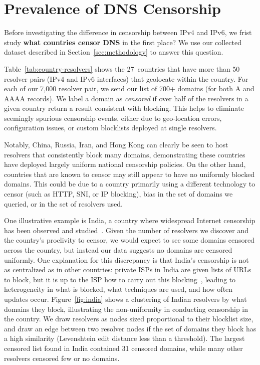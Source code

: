 \section{Prevalence of DNS Censorship}\label{sec:prevalence}


Before investigating the difference in censorship between IPv4 and IPv6, we
frist study \textbf{what countries censor DNS} in the first place?
We use our collected dataset described in Section~\ref{sec:methodology} to
answer this question.




\SomeCountryTable


Table~\ref{tab:country-resolvers} shows the 27~countries that have more than 50
resolver pairs (IPv4 and IPv6 interfaces) that geolocate within the country.
For each of our 7,000 resolver pair, we send our list of 700+ domains (for both A
and AAAA records). We label a domain as \emph{censored} if over half of the
resolvers in a given country return a result consistent with blocking. This
helps to eliminate seemingly spurious censorship events, either due to geo-location
errors, configuration issues, or custom blocklists deployed at single resolvers.

Notably, China, Russia, Iran, and Hong Kong can clearly be seen to host
resolvers that consistently block many domains, demonstrating these countries have
deployed largely uniform national censorship policies. On the other hand,
countries that are known to censor may still appear to have no uniformly blocked
domains. This could be due to a country primarily using a different technology
to censor (such as HTTP, SNI, or IP blocking), bias in the set of domains we
queried, or in the set of resolvers used.

One illustrative example is India, a country where widespread Internet censorship has
been observed and studied~\cite{singh2020india,Yadav2018a}. Given the number
of resolvers we discover and the country's proclivity to censor, we would expect to see
some domains censored across the country, but instead our data suggests no
domains are censored uniformly. One explanation for this discrepancy is that
India's censorship is not as centralized as in other countries: private ISPs in
India are given lists of URLs to block, but it is up to the ISP how to carry out
this blocking~\cite{Gosain2017a}, leading to heterogeneity in what is blocked,
what techniques are used, and how often updates occur.  Figure~\ref{fig:india}
shows a clustering of Indian resolvers by what domains they block, illustrating the non-uniformity in
conducting censorship in the country. We draw resolvers as nodes sized proportional
to their blocklist size, and draw an edge between two resolver
nodes if the set of domains they block has a high similarity (Levenshtein edit
distance less than a threshold). The largest censored list found in India contained 31
censored domains, while many other resolvers censored few or no domains.


\FigIndiaCluster


